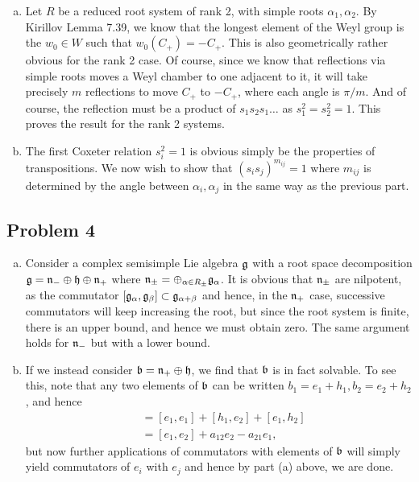\documentclass{../../mathnotes}
\begin{document}
\begin{enumerate}[(a)]
    \item Let $R$ be a reduced root system of rank 2, with simple roots $\alpha_1,\alpha_2$. By Kirillov Lemma 7.39,
        we know that the longest element of the Weyl group is the $w_0\in W$ such that $w_0(C_+)=-C_+$. This is also
        geometrically rather obvious for the rank 2 case. Of course, since we know that reflections via simple roots moves
        a Weyl chamber to one adjacent to it, it will take precisely $m$ reflections to move $C_+$ to $-C_+$, where
        each angle is $\pi/m$. And of course, the reflection must be a product of $s_1s_2s_1\ldots$ as $s_1^2=s_2^2=1$.
        This proves the result for the rank 2 systems.
    \item The first Coxeter relation $s_i^2=1$ is obvious simply be the properties of transpositions. We now wish to show
        that $(s_is_j)^{m_{ij}}=1$ where $m_{ij}$ is determined by the angle between $\alpha_i,\alpha_j$ in the same way as
        the previous part.
        
        
\end{enumerate}

\subsection*{Problem 4}

\begin{enumerate}[(a)]
    \item Consider a complex semisimple Lie algebra $\mathfrak g$ with a root space decomposition $\mathfrak g=\mathfrak n_-\oplus\mathfrak h\oplus\mathfrak n_+$
        where $\mathfrak n_{\pm}=\oplus_{\alpha\in R_\pm}\mathfrak g_\alpha$. It is obvious that $\mathfrak n_\pm$ are nilpotent, as the commutator
        $[\mathfrak g_\alpha,\mathfrak g_\beta]\subset \mathfrak g_{\alpha+\beta}$ and hence, in the $\mathfrak n_+$ case, successive commutators will
        keep increasing the root, but since the root system is finite, there is an upper bound, and hence we must obtain zero.
        The same argument holds for $\mathfrak n_-$ but with a lower bound.
    \item If we instead consider $\mathfrak b=\mathfrak n_+\oplus\mathfrak h$, we find that $\mathfrak b$ is in fact solvable. To see this, note that
        any two elements of $\mathfrak b$ can be written $b_1=e_1+h_1,b_2=e_2+h_2$, and hence
        \begin{align*}
            [b_1,b_2]&=[e_1,e_1]+[h_1,e_2]+[e_1,h_2]\\
            &=[e_1,e_2]+a_{12}e_2-a_{21}e_1,
        \end{align*}
        but now further applications of commutators with elements of $\mathfrak b$ will simply yield commutators of $e_i$ with $e_j$ and
        hence by part (a) above, we are done.
\end{enumerate}
\end{document}
